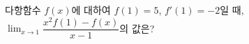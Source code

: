 다항함수 $f(x)$에 대하여 $f(1)=5$, $f'(1)=-2$일 때, $\displaystyle\lim_{x\to 1}\dfrac{x^2 f(1)-f(x)}{x-1}$의 값은?
